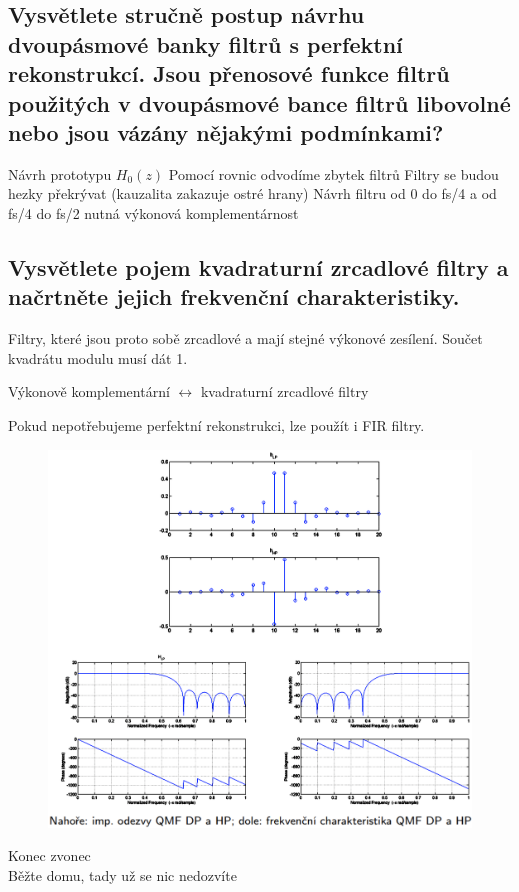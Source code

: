 \documentclass[a4paper,12pt]{article}   %
\newcommand{\mt}[1]{$#1$}
\begin{document}
\FloatBarrier
\subsection{Vysvětlete stručně postup návrhu dvoupásmové banky filtrů s perfektní rekonstrukcí. Jsou přenosové funkce filtrů použitých v dvoupásmové bance filtrů libovolné nebo jsou vázány nějakými podmínkami?}

\begin{outline}[enumerate]
        \1 Návrh prototypu \mt{H_0(z)}
        \1 Pomocí rovnic odvodíme zbytek filtrů
                \2 Filtry se budou hezky překrývat (kauzalita zakazuje ostré hrany)
        \1 Návrh filtru od 0 do fs/4 a od fs/4 do fs/2
                \2 nutná výkonová komplementárnost
\end{outline}



\subsection{Vysvětlete pojem kvadraturní zrcadlové filtry a načrtněte jejich frekvenční charakteristiky.}

Filtry, které jsou proto sobě zrcadlové a mají stejné výkonové zesílení. Součet kvadrátu modulu musí dát 1. 

Výkonově komplementární \mt{\leftrightarrow} kvadraturní zrcadlové filtry

Pokud nepotřebujeme perfektní rekonstrukci, lze použít i FIR filtry.

\begin{figure}[h!]
        \centering
        \includegraphics[width=.9\textwidth]{fig/qmf.png}
\end{figure}
\FloatBarrier
\vfill
\begin{flushright}
        Konec zvonec\\
        Běžte domu, tady už se nic nedozvíte
\end{flushright}
\end{document}

